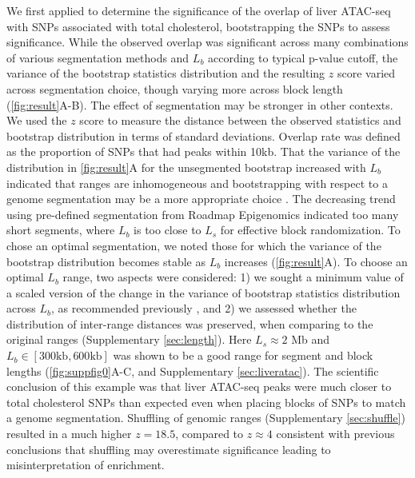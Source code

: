 We first applied \bootranges to determine the significance of the
overlap of liver ATAC-seq
\citep{CURRIN20211169} with SNPs associated with total cholesterol,
bootstrapping the SNPs to assess significance.
While the observed overlap was significant across many combinations of
various segmentation methods and $L_b$ according to typical p-value cutoff,
the variance of the bootstrap statistics distribution 
and the resulting $z$ score varied across 
segmentation choice, though varying more across block length 
(\cref{fig:result}A-B). The effect of segmentation may be stronger 
in other contexts.
We used the $z$ score to measure the distance between the observed
statistics and bootstrap distribution in terms of standard deviations.
Overlap rate was defined as the proportion of
SNPs that had peaks within 10kb.
That the variance of the distribution in \cref{fig:result}A for the
unsegmented bootstrap increased with $L_b$ indicated that
ranges are inhomogeneous and
bootstrapping with respect to a genome
segmentation may be a more appropriate choice
\citep{bickel2010subsampling}. 
The decreasing trend using pre-defined segmentation from
Roadmap Epigenomics indicated too many short segments,
where $L_b$ is too close to $L_s$ for effective block randomization.
To chose an optimal segmentation, 
we noted those for which the variance of the bootstrap distribution 
becomes stable as $L_b$ increases (\cref{fig:result}A).
To choose an optimal $L_b$ range, two aspects were considered:
1) we sought a minimum value of a scaled version of the change 
in the variance of bootstrap statistics distribution across $L_b$, 
as recommended previously \citep{bickel2010subsampling},
and 2) we assessed whether the distribution of inter-range distances  
was preserved, when comparing to the original ranges 
(Supplementary \cref{sec:length}).
Here $L_s \approx 2$ Mb and $L_b \in [300\textrm{kb},600\textrm{kb}]$ was 
shown to be a good range for segment and block
lengths (\cref{fig:suppfig0}A-C, and Supplementary \cref{sec:liveratac}).
The scientific conclusion of this example was that liver ATAC-seq
peaks were
much closer to total cholesterol SNPs than expected even when placing
blocks of SNPs to match a genome segmentation. 
Shuffling of genomic ranges (Supplementary \cref{sec:shuffle})
resulted in a much higher $z = 18.5$, compared to $z \approx 4$ 
consistent with previous conclusions that shuffling may 
overestimate significance leading to misinterpretation of enrichment.



